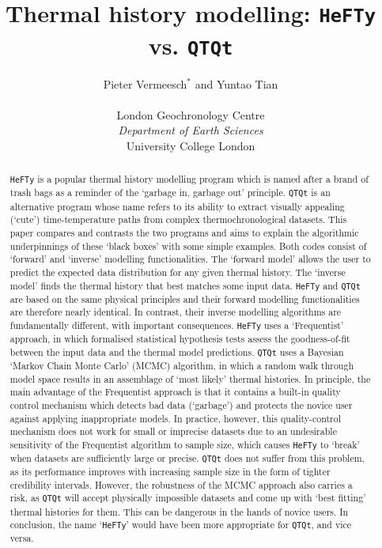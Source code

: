 \documentclass{article}
\title{Thermal history modelling: {\tt HeFTy} vs. {\tt QTQt}}
\author{Pieter Vermeesch$^*$ and Yuntao Tian \\~\\ 
London Geochronology Centre\\{\it Department of Earth Sciences}\\ 
University College London}
\date{}
\begin{document}
\maketitle


\begin{abstract}
{\tt HeFTy} is a popular thermal history modelling program which is
named after a brand of trash bags as a reminder of the `garbage in,
garbage out' principle.  {\tt QTQt} is an alternative program whose
name refers to its ability to extract visually appealing (`cute')
time-temperature paths from complex thermochronological datasets.
This paper compares and contrasts the two programs and aims to explain
the algorithmic underpinnings of these `black boxes' with some simple
examples.  Both codes consist of `forward' and `inverse' modelling
functionalities.  The `forward model' allows the user to predict the
expected data distribution for any given thermal history. The `inverse
model' finds the thermal history that best matches some input
data. {\tt HeFTy} and {\tt QTQt} are based on the same physical
principles and their forward modelling functionalities are therefore
nearly identical. In contrast, their inverse modelling algorithms are
fundamentally different, with important consequences.  {\tt HeFTy}
uses a `Frequentist' approach, in which formalised statistical
hypothesis tests assess the goodness-of-fit between the input data and
the thermal model predictions. {\tt QTQt} uses a Bayesian `Markov
Chain Monte Carlo' (MCMC) algorithm, in which a random walk through
model space results in an assemblage of `most likely' thermal
histories.  In principle, the main advantage of the Frequentist
approach is that it contains a built-in quality control mechanism
which detects bad data (`garbage') and protects the novice user
against applying inappropriate models.  In practice, however, this
quality-control mechanism does not work for small or imprecise
datasets due to an undesirable sensitivity of the Frequentist
algorithm to sample size, which causes {\tt HeFTy} to `break' when
datasets are sufficiently large or precise. {\tt QTQt} does not suffer
from this problem, as its performance improves with increasing sample
size in the form of tighter credibility intervals. However, the
robustness of the MCMC approach also carries a risk, as {\tt QTQt}
will accept physically impossible datasets and come up with `best
fitting' thermal histories for them. This can be dangerous in the
hands of novice users.  In conclusion, the name `{\tt HeFTy}' would
have been more appropriate for {\tt QTQt}, and vice versa.
\end{abstract}
\end{document}
